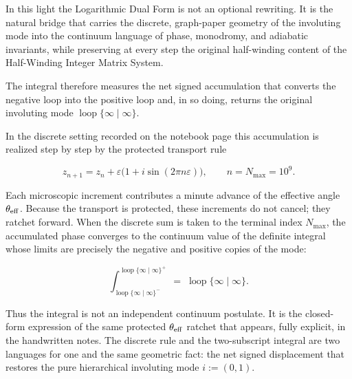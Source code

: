 In this light the Logarithmic Dual Form is not an optional rewriting. It is the natural bridge that carries the discrete, graph-paper geometry of the involuting mode into the continuum language of phase, monodromy, and adiabatic invariants, while preserving at every step the original half-winding content of the Half-Winding Integer Matrix System.

The integral therefore measures the net signed accumulation that converts the negative loop into the positive loop and, in so doing, returns the original involuting mode \(\operatorname{loop}\{\infty\mid\infty\}\).  

In the discrete setting recorded on the notebook page this accumulation is realized step by step by the protected transport rule

\[
z_{n+1}=z_n+\varepsilon\bigl(1+i\sin(2\pi n\varepsilon)\bigr),
\qquad
n=N_{\max}=10^9.
\]

Each microscopic increment contributes a minute advance of the effective angle \(\theta_{\rm eff}\). Because the transport is protected, these increments do not cancel; they ratchet forward. When the discrete sum is taken to the terminal index \(N_{\max}\), the accumulated phase converges to the continuum value of the definite integral whose limits are precisely the negative and positive copies of the mode:

\[
\int_{\operatorname{loop}\{\infty\mid\infty\}^{-}}^{\operatorname{loop}\{\infty\mid\infty\}^{+}}
\;=\;
\operatorname{loop}\{\infty\mid\infty\}.
\]

Thus the integral is not an independent continuum postulate. It is the closed-form expression of the same protected \(\theta_{\rm eff}\) ratchet that appears, fully explicit, in the handwritten notes. The discrete rule and the two-subscript integral are two languages for one and the same geometric fact: the net signed displacement that restores the pure hierarchical involuting mode \(i:=(0,1)\).
